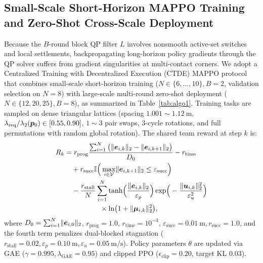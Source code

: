 \subsection{Small-Scale Short-Horizon MAPPO Training and Zero-Shot Cross-Scale Deployment}\label{subsec:mappo}
Because the $B$-round block QP filter $L$ involves nonsmooth active-set switches and local settlements, backpropagating long-horizon policy gradients through the QP solver suffers from gradient singularities at multi-contact corners. We adopt a Centralized Training with Decentralized Execution (CTDE) MAPPO protocol \cite{yu2022mappo} that combines small-scale short-horizon training ($N\in\{6,\dots,10\},B=2$, validation selection on $N=8$) with large-scale multi-round zero-shot deployment ($N\in\{12,20,25\},B=8$), as summarized in Table~\ref{tab:algo1}. Training tasks are sampled on dense triangular lattices (spacing $1.001\sim 1.12\ \mathrm m$, $\lambda_{\mathrm{req}}/\lambda_2(\boldsymbol{p}_0)\in[0.55,0.90]$, $1\sim 3$ pair swaps, 3-cycle rotations, and full permutations with random global rotation). The shared team reward at step $k$ is:
\begin{equation}
\begin{split}
 R_k &= r_{\mathrm{prog}}\frac{\sum_{i=1}^N\big(\lVert\boldsymbol{e}_{i,k}\rVert_2-\lVert\boldsymbol{e}_{i,k+1}\rVert_2\big)}{D_0} - r_{\mathrm{time}}\\
 &\quad + r_{\mathrm{succ}}\mathbb I\Big(\max_{i\in\mathcal V}\lVert\boldsymbol{e}_{i,k+1}\rVert_2\le\varepsilon_{\mathrm{succ}}\Big)\\
 &\quad - \frac{r_{\mathrm{stall}}}{N}\sum_{i=1}^N\tanh\!\Big(\frac{\lVert\boldsymbol{e}_{i,k}\rVert_2}{\varepsilon_p}\Big)\exp\!\Big(-\frac{\lVert\boldsymbol{u}_{i,k}\rVert_2^2}{\varepsilon_u^2}\Big)\\
 &\quad\qquad\qquad\times\ln\!\big(1+\lVert\boldsymbol\mu_{i,k}\rVert_2^2\big),
\end{split}\label{eq:reward}
\end{equation}
where $D_0=\sum_{i=1}^N\lVert\boldsymbol{e}_{i,0}\rVert_2$, $r_{\mathrm{prog}}=1.0$, $r_{\mathrm{time}}=10^{-3}$, $\varepsilon_{\mathrm{succ}}=0.01\ \mathrm m,r_{\mathrm{succ}}=1.0$, and the fourth term penalizes dual-blocked stagnation ($r_{\mathrm{stall}}=0.02,\varepsilon_p=0.10\ \mathrm m,\varepsilon_u=0.05\ \mathrm{m/s}$). Policy parameters $\theta$ are updated via GAE ($\gamma=0.995,\lambda_{\mathrm{GAE}}=0.95$) and clipped PPO ($\epsilon_{\mathrm{clip}}=0.20$, target KL $0.03$).

